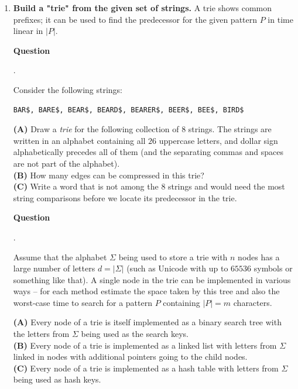 \documentclass[a4paper,12pt]{article}
\newcounter{mcounter}
\newcommand\showmcounter{\addtocounter{mcounter}{1}\themcounter}
\begin{document}
{\begin{enumerate}[label=4.\Alph*.]
\vspace{10pt}
{\bf Question \showmcounter.}
Write a regular expression to recognize all those strings that contain only digits
and represent integer numbers divisible by 8. Use the Python function {\tt re.fullmatch(...)}.

\vspace{10pt}
{\bf Question \showmcounter.}
Write a regular expression to find all 8-digit sequences and prepend 
the Latvia area code. For example, a phone number {\tt 12345678} should become
{\tt +371-12345678}. 




\item {\bf Build a "trie" from the given set of strings.}
A trie shows common prefixes; it can be used to find the 
predecessor for the given pattern $P$ in time linear in $|P|$.

\vspace{10pt}
{\bf Question \showmcounter.}
Consider the following strings:
\begin{verbatim}
BAR$, BARE$, BEAR$, BEARD$, BEARER$, BEER$, BEE$, BIRD$
\end{verbatim}
{\bf (A)} Draw a {\em trie} for the following collection of $8$ strings. 
The strings are written in an alphabet containing all $26$ uppercase 
letters, and dollar sign alphabetically precedes all of them (and the 
separating commas and spaces are not part of the alphabet).\\
{\bf (B)} How many edges can be compressed in this trie?\\
{\bf (C)} Write a word that is not among the $8$ strings and would need the most string comparisons 
before we locate its predecessor in the trie.

\vspace{10pt}
{\bf Question \showmcounter.}
Assume that the alphabet $\Sigma$ being used to store a trie with $n$ 
nodes has a large number of letters $d = |\Sigma|$ (such as Unicode with up to $65536$ 
symbols or something like that). 
A single node in the trie can be implemented in various ways -- for each method 
estimate the space taken by this tree and also the worst-case time to search for a pattern $P$
containing $|P| = m$ characters. 

{\bf (A)} Every node of a trie is itself implemented as a binary 
search tree with the letters from $\Sigma$ being used as the search keys.\\
{\bf (B)} Every node of a trie is implemented as a linked list 
with letters from $\Sigma$ linked in nodes with additional pointers going to the child nodes.\\
{\bf (C)} Every node of a trie is implemented as a hash table with 
letters from $\Sigma$ being used as hash keys.






\end{enumerate}}
\end{document}
